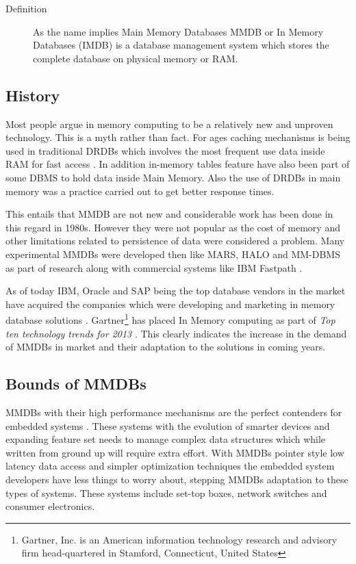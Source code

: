 \documentclass[10pt]{article} %
\begin{document}
\begin{description}
  \item[Definition] As the name implies Main Memory Databases MMDB or In Memory Databases (IMDB) is a database management system which stores the complete database on physical memory or RAM. 
\end{description}

\subsection{History}
Most people argue in memory computing to be a relatively new and unproven technology. This is a myth rather than fact. For ages caching mechanisms is being used in traditional DRDBs which involves the most frequent use data inside RAM for fast access \cite{Mcobject-Myths} . In addition in-memory tables feature have also been part of some DBMS to hold data inside Main Memory. Also the use of DRDBs in main memory was a practice carried out to get better response times. 

This entails that MMDB are not new and considerable work has been done in this regard in 1980s. However they were not popular as the cost of memory and other limitations related to persistence of data were considered a problem. Many experimental MMDBs were developed then like MARS, HALO and MM-DBMS as part of research along with commercial systems like IBM Fastpath \cite{garcia1992main}. 

As of today IBM, Oracle and SAP being the top database vendors in the market have acquired the companies which were developing and marketing in memory database solutions \cite{pressRgiants}. Gartner\footnote{Gartner, Inc. is an American information technology research and advisory firm head-quartered in Stamford, Connecticut, United States} has placed In Memory computing as part of \emph{Top ten technology trends for 2013} \cite{gartner}. This clearly indicates the increase in the demand of MMDBs in market and their adaptation to the solutions in coming years.  

\subsection{Bounds of MMDBs}
MMDBs with their high performance mechanisms are the perfect contenders for embedded systems \cite{graves2002memory}. These systems with the evolution of smarter devices and expanding feature set needs to manage complex data structures which while written from ground up will require extra effort. With MMDBs pointer style low latency data access and simpler optimization techniques the embedded system developers have less things to worry about, stepping MMDBs adaptation to these types of systems. These systems include set-top boxes, network switches and consumer electronics. 
\end{document}
